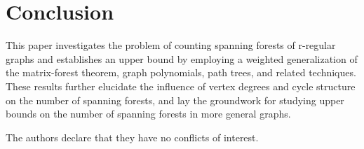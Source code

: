 \documentclass[11pt, a4paper]{article}
\theoremstyle{plain}
\renewcommand\refname{\centering References}
\begin{document}
\section{Conclusion}

This paper investigates the problem of counting spanning forests of 
r-regular graphs and establishes an upper bound by employing a weighted generalization of the matrix-forest theorem, graph polynomials, path trees, and related techniques. These results further elucidate the influence of vertex degrees and cycle structure on the number of spanning forests, and lay the groundwork for studying upper bounds on the number of spanning forests in more general graphs.


The authors declare that they have no conflicts of interest.
\renewcommand\refname{\ References}
\end{document}
